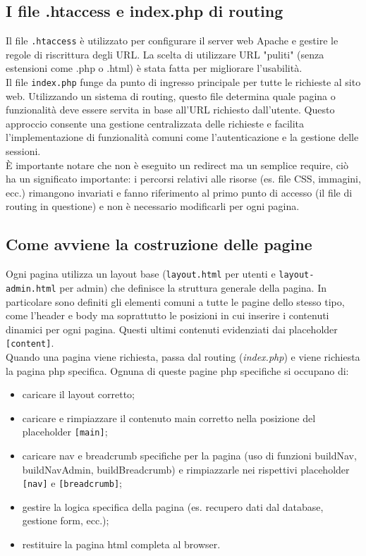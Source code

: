 \subsection{I file .htaccess e index.php di routing}
Il file \texttt{.htaccess} è utilizzato per configurare il server web Apache e gestire le regole di riscrittura degli URL. La scelta di utilizzare URL "puliti" (senza estensioni come .php o .html) è stata fatta per migliorare l'usabilità.\\
Il file \texttt{index.php} funge da punto di ingresso principale per tutte le richieste al sito web. Utilizzando un sistema di routing, questo file determina quale pagina o funzionalità deve essere servita in base all'URL richiesto dall'utente. Questo approccio consente una gestione centralizzata delle richieste e facilita l'implementazione di funzionalità comuni come l'autenticazione e la gestione delle sessioni.\\
È importante notare che non è eseguito un redirect ma un semplice require, ciò ha un significato importante: i percorsi relativi alle risorse (es. file CSS, immagini, ecc.) rimangono invariati e fanno riferimento al primo punto di accesso (il file di routing in questione) e non è necessario modificarli per ogni pagina.
\subsection{Come avviene la costruzione delle pagine}
Ogni pagina utilizza un layout base (\texttt{layout.html} per utenti e \texttt{layout-admin.html} per admin) che definisce la struttura generale della pagina. In particolare sono definiti gli elementi comuni a tutte le pagine dello stesso tipo, come l'header e body ma soprattutto le posizioni in cui inserire i contenuti dinamici per ogni pagina. Questi ultimi contenuti evidenziati dai placeholder \texttt{[content]}.\\
Quando una pagina viene richiesta, passa dal routing (\textit{index.php}) e viene richiesta la pagina php specifica. Ognuna di queste pagine php specifiche si occupano di:
\begin{itemize}
    \item caricare il layout corretto;
    \item caricare e rimpiazzare il contenuto main corretto nella posizione del placeholder \texttt{[main]};
    \item caricare nav e breadcrumb specifiche per la pagina (uso di funzioni buildNav, buildNavAdmin, buildBreadcrumb) e rimpiazzarle nei rispettivi placeholder \texttt{[nav]} e \texttt{[breadcrumb]};   \item gestire la logica specifica della pagina (es. recupero dati dal database, gestione form, ecc.);
    \item restituire la pagina html completa al browser.
\end{itemize}
